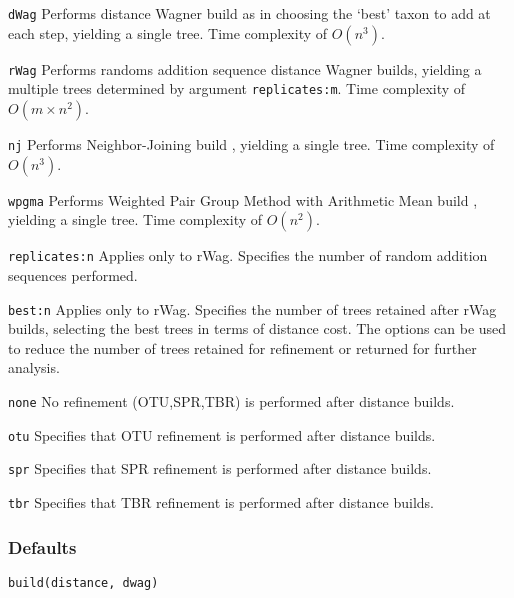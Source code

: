 \documentclass[11pt]{article}
\begin{document}
		\noindent \texttt{dWag} Performs distance Wagner build as in \citep{Farris1972} choosing the `best' taxon to add at each step, 
		yielding a single tree.  Time complexity of $O(n^3)$.
		
		\smallskip
		\noindent \texttt{rWag} Performs randoms addition sequence distance Wagner builds, yielding a multiple trees determined 
		by argument \texttt{replicates:m}.  Time complexity of $O(m \times n^2)$.
		
		\smallskip		
		\noindent \texttt{nj} Performs Neighbor-Joining build \citep{Saitou1987}, yielding a single tree.  Time complexity of $O(n^3)$.
		
		\smallskip		
		\noindent \texttt{wpgma} Performs Weighted Pair Group Method with Arithmetic Mean build \citep{SokalandMichener1958}, 
		yielding a single tree.  Time complexity of $O(n^2)$.
		
		\smallskip		
		\noindent \texttt{replicates:n}  Applies only to rWag.  Specifies the number of random addition sequences performed. 
		
		\smallskip		
		\noindent \texttt{best:n} Applies only to rWag.  Specifies the number of trees retained after rWag builds, selecting 
		the best trees in terms of distance cost.  The options can be used to reduce
		the number of trees retained for refinement or returned for further analysis.  
		
		\smallskip		
		\noindent \texttt{none} No refinement (OTU,SPR,TBR) is performed after distance builds.
		
		\smallskip		
		\noindent \texttt{otu} Specifies that OTU refinement \citep{Wheeler2021} is performed after distance builds.
		
		\smallskip		
		\noindent \texttt{spr} Specifies that SPR refinement \citep{Dayhoff1969} is performed after distance builds.

		\smallskip		
		\noindent \texttt{tbr} Specifies that TBR refinement \citep{Farris1988, swofford1990a} is performed after distance builds.

		\subsubsection{Defaults}
			\texttt{build(distance, dwag)}
\end{document}
